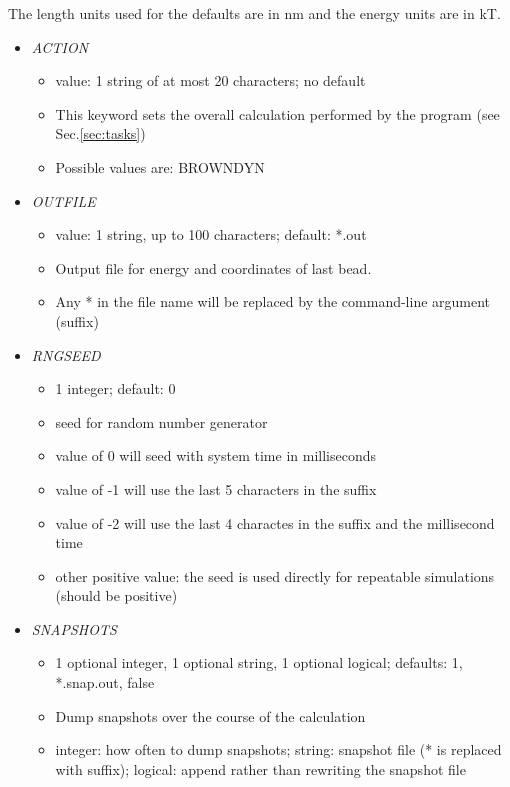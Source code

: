 \documentclass[12pt]{article}
\begin{document}
The length units used for the defaults are in nm and the energy units are in kT. 

\begin{itemize}
%
\item {\it ACTION}
  \begin{itemize}
    \item  value: 1 string of at most 20 characters; no default
    \item This keyword sets the overall calculation performed by the program (see Sec.\ref{sec:tasks})
    \item Possible values are: BROWNDYN
  \end{itemize}
\item {\it OUTFILE}
    \begin{itemize}
      \item  value: 1 string, up to 100 characters; default: *.out
      \item Output file for energy and coordinates of last bead.
      \item Any * in the file name will be replaced by the command-line argument (suffix)  
      \end{itemize}
%    
\item {\it RNGSEED}
  \begin{itemize}
    \item 1 integer; default: 0
    \item seed for random number generator
    \item value of 0 will seed with system time in milliseconds
    \item value of -1 will use the last 5 characters in the suffix
    \item value of -2 will use the last 4 charactes in the suffix and the millisecond time
    \item other positive value: the seed is used directly for repeatable simulations (should be positive)
  \end{itemize}
%
\item {\it SNAPSHOTS}
  \begin{itemize}
    \item 1 optional integer, 1 optional string, 1 optional logical; defaults: 1, *.snap.out, false 
    \item Dump snapshots over the course of the calculation
    \item integer: how often to dump snapshots; string: snapshot file (* is replaced with suffix); logical: append rather than rewriting the snapshot file
   \end{itemize}

\end{itemize}
\end{document}
